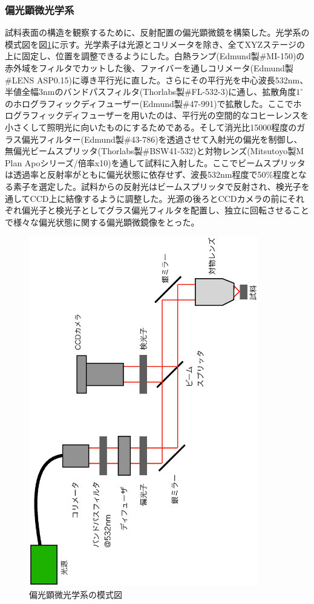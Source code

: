 \documentclass[11pt,a4paper]{jsarticle}
\begin{document}
\subsubsection{偏光顕微光学系}
試料表面の構造を観察するために、反射配置の偏光顕微鏡を構築した。光学系の模式図を図\ref{fig:microscope}に示す。光学素子は光源とコリメータを除き、全てXYZステージの上に固定し、位置を調整できるようにした。白熱ランプ(Edmund製\#MI-150)の赤外域をフィルタでカットした後、ファイバーを通しコリメータ(Edmund製\#LENS ASP0.15)に導き平行光に直した。さらにその平行光を中心波長532nm、半値全幅3nmのバンドパスフィルタ(Thorlabs製\#FL-532-3)に通し、拡散角度$1^\circ$のホログラフィックディフューザー(Edmund製\#47-991)で拡散した。ここでホログラフィックディフューザーを用いたのは、平行光の空間的なコヒーレンスを小さくして照明光に向いたものにするためである。そして消光比15000程度のガラス偏光フィルター(Edmund製\#43-786)を透過させて入射光の偏光を制御し、無偏光ビームスプリッタ(Thorlabs製\#BSW41-532)と対物レンズ(Mitsutoyo製M Plan Apoシリーズ/倍率x10)を通して試料に入射した。ここでビームスプリッタは透過率と反射率がともに偏光状態に依存せず、波長532nm程度で50\%程度となる素子を選定した。試料からの反射光はビームスプリッタで反射され、検光子を通してCCD上に結像するように調整した。光源の後ろとCCDカメラの前にそれぞれ偏光子と検光子としてグラス偏光フィルタを配置し、独立に回転させることで様々な偏光状態に関する偏光顕微鏡像をとった。
\begin{figure}[htb]
  \begin{center}
   \includegraphics[width=100mm,angle=270]{microscope.eps}
  \end{center}
  \caption{偏光顕微光学系の模式図}
  \label{fig:microscope}
\end{figure}
\end{document}
